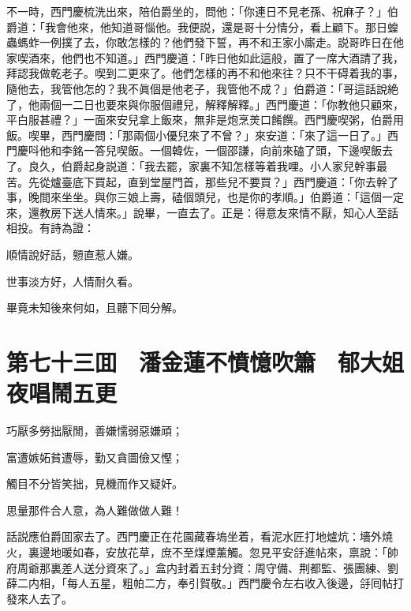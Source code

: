 不一時，西門慶梳洗出來，陪伯爵坐的，問他：「你連日不見老孫、祝麻子？」伯爵道：「我會他來，他知道哥惱他。我便説，還是哥十分情分，看上顧下。那日蝗蟲螞蚱一例撲了去，你敢怎樣的？他們發下誓，再不和王家小廝走。説哥昨日在他家喫酒來，他們也不知道。」西門慶道：「昨日他如此這般，置了一席大酒請了我，拜認我做乾老子。喫到二更來了。他們怎樣的再不和他來往？只不干碍着我的事，隨他去，我管他怎的？我不眞個是他老子，我管他不成？」伯爵道：「哥這話說絶了，他兩個一二日也要來與你服個禮兒，解釋解釋。」西門慶道：「你教他只顧來，平白服甚禮？」一面來安兒拿上飯來，無非是炮烹羙口餚饌。西門慶喫粥，伯爵用飯。喫畢，西門慶問：「那兩個小優兒來了不曾？」來安道：「來了這一日了。」西門慶呌他和李銘一答兒喫飯。一個韓佐，一個邵謙，向前來磕了頭，下邊喫飯去了。良久，伯爵起身説道：「我去罷，家裏不知怎樣等着我哩。小人家兒幹事最苦。先從爐臺底下買起，直到堂屋門首，那些兒不要買？」西門慶道：「你去幹了事，晚間來坐坐。與你三娘上壽，磕個頭兒，也是你的孝順。」伯爵道：「這個一定來，還教房下送人情來。」說畢，一直去了。正是：得意友來情不厭，知心人至話相投。有詩為證：

順情說好話，戅直惹人嫌。

世事淡方好，人情耐久看。

畢竟未知後來何如，且聽下囘分解。

\chapter*{第七十三囬　潘金蓮不憤憶吹簫　郁大姐夜唱鬧五更}

巧厭多勞拙厭閒，善嫌懦弱惡嫌頑；

富遭嫉妬貧遭辱，勤又貪圖儉又慳；

觸目不分皆笑拙，見機而作又疑奸。

思量那件合人意，為人難做做人難！

話説應伯爵囬家去了。西門慶正在花園藏春塢坐着，看泥水匠打地爐炕：墻外燒火，裏邊地暖如春，安放花草，庶不至煤煙薰觸。忽見平安㧱進帖來，禀說：「帥府周爺那裏差人送分資來了。」盒内封着五封分資：周守備、荆都監、張團練、劉薛二内相，「每人五星，粗帕二方，奉引賀敬。」西門慶令左右收入後邊，㧱囘帖打發來人去了。

